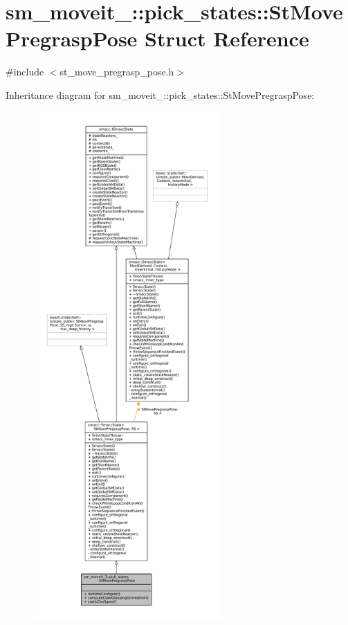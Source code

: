 \hypertarget{structsm__moveit__3_1_1pick__states_1_1StMovePregraspPose}{}\section{sm\+\_\+moveit\+\_\+:\+:pick\+\_\+states\+:\+:St\+Move\+Pregrasp\+Pose Struct Reference}
\label{structsm__moveit__3_1_1pick__states_1_1StMovePregraspPose}


{\ttfamily \#include $<$st\+\_\+move\+\_\+pregrasp\+\_\+pose.\+h$>$}



Inheritance diagram for sm\+\_\+moveit\+\_\+:\+:pick\+\_\+states\+:\+:St\+Move\+Pregrasp\+Pose\+:
\nopagebreak
\begin{figure}[H]
\begin{center}
\leavevmode
\includegraphics[height=550pt]{structsm__moveit__3_1_1pick__states_1_1StMovePregraspPose__inherit__graph}
\end{center}
\end{figure}


